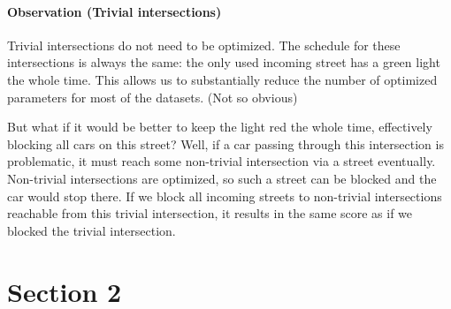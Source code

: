 \paragraph{Observation (Trivial intersections)} Trivial intersections do not need to be optimized. The schedule for these intersections is always the same: the only used incoming street has a green light the whole time. This allows us to substantially reduce the number of optimized parameters for most of the datasets. (Not so obvious)

But what if it would be better to keep the light red the whole time, effectively blocking all cars on this street? Well, if a car passing through this intersection is problematic, it must reach some non-trivial intersection via a street eventually. Non-trivial intersections are optimized, so such a street can be blocked and the car would stop there. If we block all incoming streets to non-trivial intersections reachable from this trivial intersection, it results in the same score as if we blocked the trivial intersection.



\section{Section 2}

